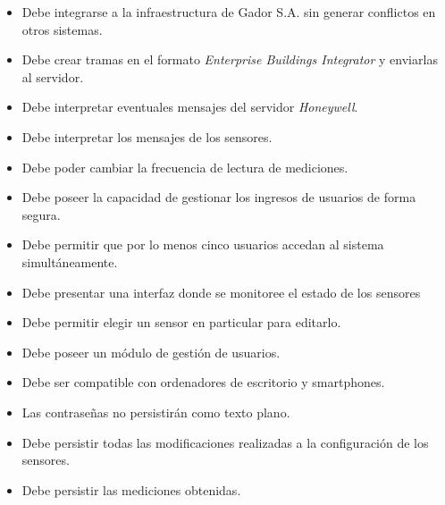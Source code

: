 \begin{itemize}
	\item Debe integrarse a la infraestructura de Gador S.A. sin generar conflictos en otros sistemas.
	\item Debe crear tramas en el formato \emph{Enterprise Buildings Integrator} y enviarlas al servidor.
	\item Debe interpretar eventuales mensajes del servidor \emph{Honeywell}.
	\item Debe interpretar los mensajes de los sensores.
	\item Debe poder cambiar la frecuencia de lectura de mediciones.
	\item Debe poseer la capacidad de gestionar los ingresos de usuarios de forma segura.
	\item Debe permitir que por lo menos cinco usuarios accedan al sistema simultáneamente.
	\item Debe presentar una interfaz donde se monitoree el estado de los sensores
	\item Debe permitir elegir un sensor en particular para editarlo.
	\item Debe poseer un módulo de gestión de usuarios.
	\item Debe ser compatible con ordenadores de escritorio y smartphones.
	\item Las contraseñas no persistirán como texto plano.
	\item Debe persistir todas las modificaciones realizadas a la configuración de los sensores.
	\item Debe persistir las mediciones obtenidas.
\end{itemize}
